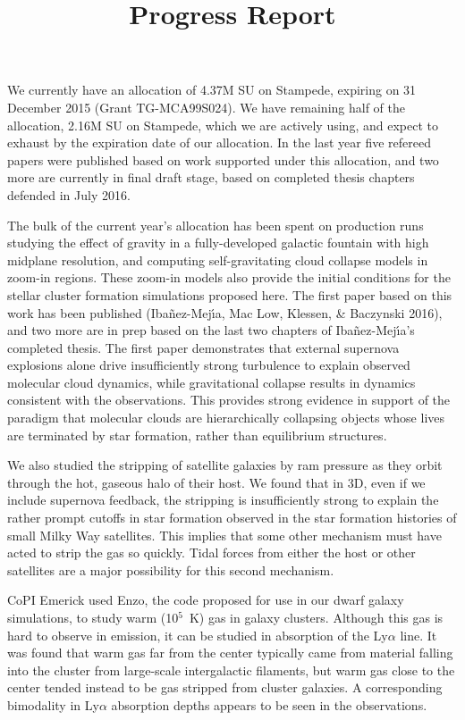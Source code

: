 \documentclass[12pt,preprint]{aastex}
\title{Progress Report}
\begin{document}
\maketitle
We currently have an allocation of 4.37M SU on Stampede, expiring on 31 December 2015 (Grant TG-MCA99S024).  We have remaining half of the allocation, 2.16M SU on Stampede, which we are actively using, and expect to exhaust by the expiration date of our allocation.  In the last year five refereed papers were published based on work supported under this allocation, and two more are currently in final draft stage, based on completed thesis chapters defended in July 2016.

The bulk of the current year's allocation has been spent on production runs studying the effect of gravity in a fully-developed galactic fountain with high midplane resolution, and computing self-gravitating cloud collapse models in zoom-in regions. These zoom-in models also provide the initial conditions for the stellar cluster formation simulations proposed here. The first paper based on this work has been published (Iba\~nez-Mej\'{\i}a, Mac Low, Klessen, \& Baczynski 2016), and two more are in prep based on the last two chapters of Iba\~nez-Mej\'{\i}a's completed thesis. The first paper demonstrates that external supernova explosions alone drive insufficiently strong turbulence to explain observed molecular cloud dynamics, while gravitational collapse results in dynamics consistent with the observations. This provides strong evidence in support of the paradigm that molecular clouds are hierarchically collapsing objects whose lives are terminated by star formation, rather than equilibrium structures.  

We also studied the stripping of satellite galaxies by ram pressure as they orbit through the hot, gaseous halo of their host. We found that in 3D, even if we include supernova feedback, the stripping is insufficiently strong to explain the rather prompt cutoffs in star formation observed in the star formation histories of small Milky Way satellites.  This implies that some other mechanism must have acted to strip the gas so quickly. Tidal forces from either the host or other satellites are a major possibility for this second mechanism.

CoPI Emerick used Enzo, the code proposed for use in our dwarf galaxy simulations, to study warm (10$^5$~K) gas in galaxy clusters.  Although this gas is hard to observe in emission, it can be studied in absorption of the Ly$\alpha$ line.  It was found that warm gas far from the center typically came from material falling into the cluster from large-scale intergalactic filaments, but warm gas close to the center tended instead to be gas stripped from cluster galaxies.  A corresponding bimodality in Ly$\alpha$ absorption depths appears to be seen in the observations.
\end{document}
